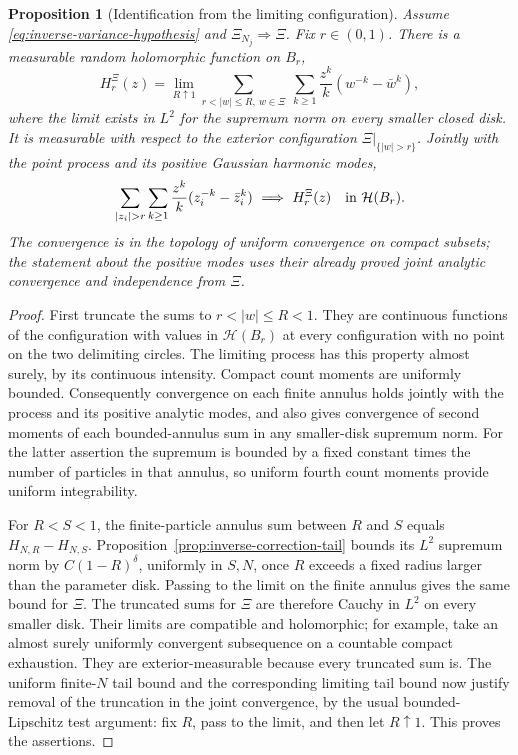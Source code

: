 \documentclass[11pt,a4paper]{article}
\numberwithin{equation}{section}
\newtheorem{proposition}[theorem]{Proposition}
\theoremstyle{definition}
\theoremstyle{remark}
\begin{document}
\begin{proposition}[Identification from the limiting configuration]
\label{prop:inverse-field-identification}
Assume \eqref{eq:inverse-variance-hypothesis} and
$\Xi_{N_j}\Rightarrow\Xi$. Fix $r\in(0,1)$. There is a measurable
random holomorphic function on $B_r$,
\begin{equation}\label{eq:inverse-exterior-limit-definition}
 H_r^{\Xi}(z)=\lim_{R\uparrow1}
    \sum_{r<|w|\leq R,\ w\in\Xi}\ \sum_{k\geq1}
       \frac{z^k}{k}(w^{-k}-\bar w^k),
\end{equation}
where the limit exists in $L^2$ for the supremum norm on every smaller
closed disk. It is measurable with respect to the exterior configuration
$\Xi|_{\{|w|>r\}}$. Jointly with the point process and its positive
Gaussian harmonic modes,
\[
 \sum_{|z_i|>r}\sum_{k\geq1}\frac{z^k}{k}
                         (z_i^{-k}-\bar z_i^k)
 \ \Longrightarrow\ H_r^{\Xi}(z)
 \quad\hbox{in }\mathcal H(B_r).
\]
The convergence is in the topology of uniform convergence on compact
subsets; the statement about the positive modes uses their already proved
joint analytic convergence and independence from $\Xi$.
\end{proposition}
\begin{proof}
First truncate the sums to $r<|w|\leq R<1$. They are continuous functions
of the configuration with values in $\mathcal H(B_r)$ at every
configuration with no point on the two delimiting circles. The limiting
process has this property almost surely, by its continuous intensity.
Compact count moments are uniformly bounded. Consequently convergence
on each finite annulus holds jointly with the process and its positive
analytic modes, and also gives convergence of second moments of each
bounded-annulus sum in any smaller-disk supremum norm. For the latter
assertion the supremum is bounded by a fixed constant times the number
of particles in that annulus, so uniform fourth count moments provide
uniform integrability.

For $R<S<1$, the finite-particle annulus sum between $R$ and $S$ equals
$H_{N,R}-H_{N,S}$. Proposition~\ref{prop:inverse-correction-tail} bounds
its $L^2$ supremum norm by $C(1-R)^\delta$, uniformly in $S,N$, once
$R$ exceeds a fixed radius larger than the parameter disk. Passing to
the limit on the finite annulus gives the same bound for $\Xi$.
The truncated sums for $\Xi$ are therefore Cauchy in $L^2$ on every
smaller disk. Their limits are compatible and holomorphic; for example,
take an almost surely uniformly convergent subsequence on a countable
compact exhaustion. They are exterior-measurable because every truncated
sum is. The uniform finite-$N$ tail bound and the corresponding limiting
tail bound now justify removal of the truncation in the joint convergence,
by the usual bounded-Lipschitz test argument: fix $R$, pass to the limit,
and then let $R\uparrow1$. This proves the assertions.
\end{proof}
\end{document}
